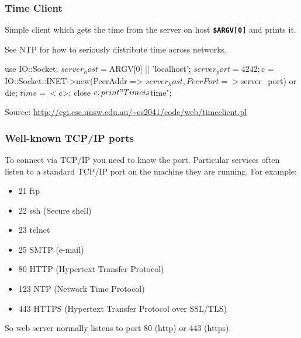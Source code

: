 \begin{frame}[fragile]
\frametitle{Time Client}

Simple client which gets the time from the server on host \textbf{\tt{\$ARGV[0]}}
and prints it.

See NTP for how to seriously distribute time across networks.

\begin{perl}
use IO::Socket;
$server_host =  $ARGV[0] || 'localhost';
$server_port = 4242;
$c = IO::Socket::INET->new(PeerAddr => $server_host,
                PeerPort  => $server_port) or die;
$time = <$c>;
close $c;
print "Time is $time\n";
\end{perl}

{\tiny Source:  \href{http://cgi.cse.unsw.edu.au/~cs2041/code/web/timeclient.pl}{http://cgi.cse.unsw.edu.au/{\textasciitilde}cs2041/code/web/timeclient.pl}}

\end{frame}

\begin{frame}
\frametitle{Well-known TCP/IP ports}
To connect via TCP/IP you need to know the port.
Particular services often listen to a standard TCP/IP port
on the machine they are running. For example:

\begin{itemize}
\item  21 ftp
\item  22 ssh (Secure shell)
\item  23 telnet
\item  25 SMTP (e-mail)
\item  80 HTTP (Hypertext Transfer Protocol)
\item  123 NTP (Network Time Protocol)
\item  443 HTTPS (Hypertext Transfer Protocol over SSL/TLS)
\end{itemize}

So web server normally listens to port 80 (http) or 443 (https).

\end{frame}


